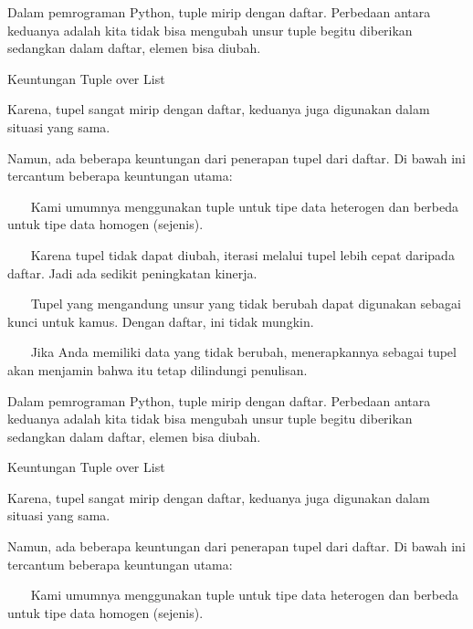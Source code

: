 \vspace{12pt}
\vspace{12pt}
\vspace{12pt}
\vspace{12pt}
\vspace{12pt}
Dalam pemrograman Python, tuple mirip dengan daftar. Perbedaan antara keduanya adalah kita tidak bisa mengubah unsur tuple begitu diberikan sedangkan dalam daftar, elemen bisa diubah. \par
Keuntungan Tuple over List \par
\vspace{12pt}
Karena, tupel sangat mirip dengan daftar, keduanya juga digunakan dalam situasi yang sama. \par
\vspace{12pt}
Namun, ada beberapa keuntungan dari penerapan tupel dari daftar. Di bawah ini tercantum beberapa keuntungan utama: \par
\vspace{12pt}
~~~ Kami umumnya menggunakan tuple untuk tipe data heterogen dan berbeda untuk tipe data homogen (sejenis). \par
~~~ Karena tupel tidak dapat diubah, iterasi melalui tupel lebih cepat daripada daftar. Jadi ada sedikit peningkatan kinerja. \par
~~~ Tupel yang mengandung unsur yang tidak berubah dapat digunakan sebagai kunci untuk kamus. Dengan daftar, ini tidak mungkin. \par
~~~ Jika Anda memiliki data yang tidak berubah, menerapkannya sebagai tupel akan menjamin bahwa itu tetap dilindungi penulisan. \par
\vspace{12pt}
Dalam pemrograman Python, tuple mirip dengan daftar. Perbedaan antara keduanya adalah kita tidak bisa mengubah unsur tuple begitu diberikan sedangkan dalam daftar, elemen bisa diubah. \par
Keuntungan Tuple over List \par
\vspace{12pt}
Karena, tupel sangat mirip dengan daftar, keduanya juga digunakan dalam situasi yang sama. \par
\vspace{12pt}
Namun, ada beberapa keuntungan dari penerapan tupel dari daftar. Di bawah ini tercantum beberapa keuntungan utama: \par
\vspace{12pt}
~~~ Kami umumnya menggunakan tuple untuk tipe data heterogen dan berbeda untuk tipe data homogen (sejenis). \par
